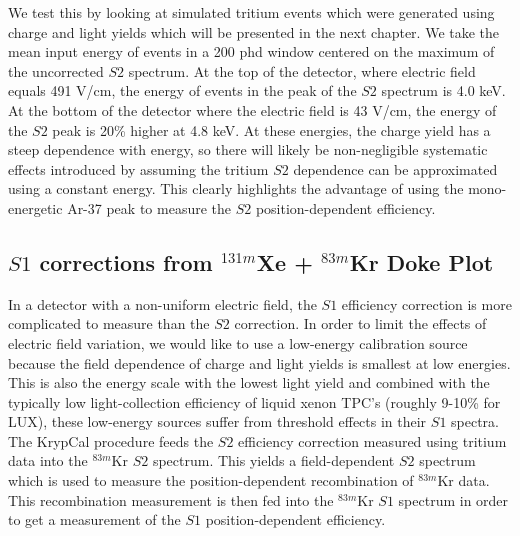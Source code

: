 {We test this by looking at simulated tritium events which were generated using charge and light yields which will be presented in the next chapter. We take the mean input energy of events in a 200 phd window centered on the maximum of the uncorrected $S2$ spectrum. At the top of the detector, where electric field equals 491 V/cm, the energy of events in the peak of the $S2$ spectrum is 4.0 keV. At the bottom of the detector where the electric field is 43 V/cm, the energy of the $S2$ peak is 20\% higher at 4.8 keV. At these energies, the charge yield has a steep dependence with energy, so there will likely be non-negligible systematic effects introduced by assuming the tritium $S2$ dependence can be approximated using a constant energy. This clearly highlights the advantage of using the mono-energetic Ar-37 peak to measure the $S2$ position-dependent efficiency.

\subsection{$S1$ corrections from $^{131m}$Xe + $^{83m}$Kr Doke Plot}\label{sec:s1dokeplot}
In a detector with a non-uniform electric field, the $S1$ efficiency correction is more complicated to measure than the $S2$ correction. In order to limit the effects of electric field variation, we would like to use a low-energy calibration source because the field dependence of charge and light yields is smallest at low energies. This is also the energy scale with the lowest light yield and combined with the typically low light-collection efficiency of liquid xenon TPC's (roughly 9-10\% for LUX), these low-energy sources suffer from threshold effects in their $S1$ spectra. The KrypCal procedure feeds the $S2$ efficiency correction measured using tritium data into the $^{83m}$Kr $S2$ spectrum. This yields a field-dependent $S2$ spectrum which is used to measure the position-dependent recombination of $^{83m}$Kr data. This recombination measurement is then fed into the $^{83m}$Kr $S1$ spectrum in order to get a measurement of the $S1$ position-dependent efficiency.

}
